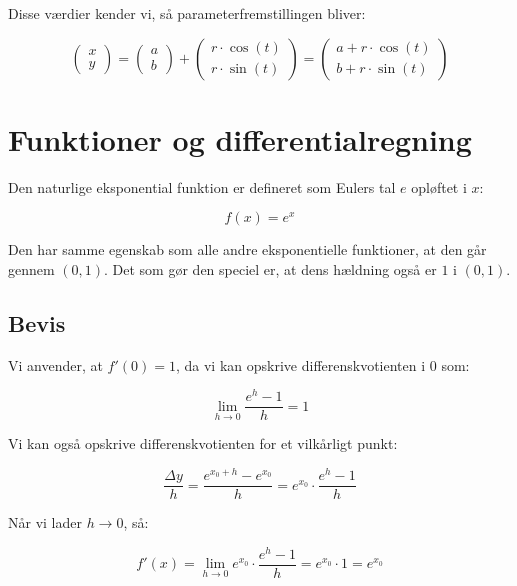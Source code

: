 \documentclass{article}
\makeatletter
\newenvironment{proofw}{\par
  \pushQED{\qed}%
  \normalfont \topsep6\p@\@plus6\p@\relax
  \trivlist
  \item[]\ignorespaces
}{%
  \popQED\endtrivlist\@endpefalse
}
\makeatother
\begin{document}
\begin{proofw}
    Disse værdier kender vi, så parameterfremstillingen bliver:

    $$
    \begin{pmatrix}
        x \\ y
    \end{pmatrix}
    =\begin{pmatrix}
        a \\ b
    \end{pmatrix}
    +
    \begin{pmatrix}
        r \cdot \cos(t)
        \\
        r \cdot \sin(t)
    \end{pmatrix}
    =\begin{pmatrix}
        a+ r \cdot \cos(t)
        \\
        b+ r \cdot \sin(t)
    \end{pmatrix}
    $$

\end{proofw}

\section{Funktioner og differentialregning}

Den naturlige eksponential funktion er defineret som Eulers tal $e$ opløftet i $x$:

$$f(x)=e^x$$

Den har samme egenskab som alle andre eksponentielle funktioner, at den går gennem $(0,1)$.
Det som gør den speciel er, at dens hældning også er $1$ i $(0,1)$.

\subsection{Bevis}
\begin{proofw}
    Vi anvender, at $f'(0)=1$, da vi kan opskrive differenskvotienten i $0$ som:

    $$
    \lim_{h \rightarrow 0}
    \frac{e^h-1}{h}=1
    $$

    Vi kan også opskrive differenskvotienten for et vilkårligt punkt:

    $$
        \frac{\Delta y}{h}=\frac{e^{x_0+h}-e^{x_0}}{h}=e^{x_0}\cdot \frac{e^h-1}{h}
    $$

    Når vi lader $h \rightarrow 0$, så:

    $$
       f'(x)= \lim_{h \rightarrow 0} e^{x_0} \cdot \frac{e^h-1}{h}=e^{x_0} \cdot 1=e^{x_0}
    $$

\end{proofw}
\end{document}
